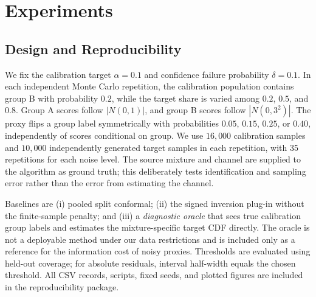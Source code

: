 \documentclass[twoside,11pt]{article}
\begin{document}
\section{Experiments}
\subsection{Design and Reproducibility}
We fix the calibration target $\alpha=0.1$ and confidence failure probability $\delta=0.1$. In each independent Monte Carlo repetition, the calibration population contains group B with probability $0.2$, while the target share is varied among $0.2$, $0.5$, and $0.8$. Group A scores follow $|N(0,1)|$, and group B scores follow $|N(0,3^2)|$. The proxy flips a group label symmetrically with probabilities $0.05$, $0.15$, $0.25$, or $0.40$, independently of scores conditional on group. We use $16{,}000$ calibration samples and $10{,}000$ independently generated target samples in each repetition, with 35 repetitions for each noise level. The source mixture and channel are supplied to the algorithm as ground truth; this deliberately tests identification and sampling error rather than the error from estimating the channel.

Baselines are (i) pooled split conformal; (ii) the signed inversion plug-in without the finite-sample penalty; and (iii) a \emph{diagnostic oracle} that sees true calibration group labels and estimates the mixture-specific target CDF directly. The oracle is not a deployable method under our data restrictions and is included only as a reference for the information cost of noisy proxies. Thresholds are evaluated using held-out coverage; for absolute residuals, interval half-width equals the chosen threshold. All CSV records, scripts, fixed seeds, and plotted figures are included in the reproducibility package.
\end{document}
